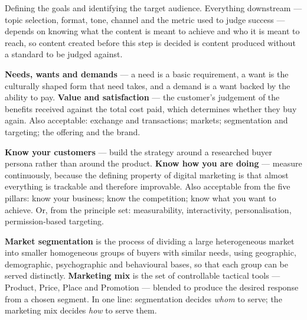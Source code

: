 \begin{qlist}
Defining the goals and identifying the target audience. Everything downstream
--- topic selection, format, tone, channel and the metric used to judge success
--- depends on knowing what the content is meant to achieve and who it is meant
to reach, so content created before this step is decided is content produced
without a standard to be judged against.

\textbf{Needs, wants and demands} --- a need is a basic requirement, a want is
the culturally shaped form that need takes, and a demand is a want backed by
the ability to pay. \textbf{Value and satisfaction} --- the customer's judgement
of the benefits received against the total cost paid, which determines whether
they buy again. Also acceptable: exchange and transactions; markets;
segmentation and targeting; the offering and the brand.

\textbf{Know your customers} --- build the strategy around a researched buyer
persona rather than around the product. \textbf{Know how you are doing} ---
measure continuously, because the defining property of digital marketing is
that almost everything is trackable and therefore improvable. Also acceptable
from the five pillars: know your business; know the competition; know what you
want to achieve. Or, from the principle set: measurability, interactivity,
personalisation, permission-based targeting.

\textbf{Market segmentation} is the process of dividing a large heterogeneous
market into smaller homogeneous groups of buyers with similar needs, using
geographic, demographic, psychographic and behavioural bases, so that each
group can be served distinctly. \textbf{Marketing mix} is the set of
controllable tactical tools --- Product, Price, Place and Promotion --- blended
to produce the desired response from a chosen segment. In one line:
segmentation decides \emph{whom} to serve; the marketing mix decides
\emph{how} to serve them.

\end{qlist}

